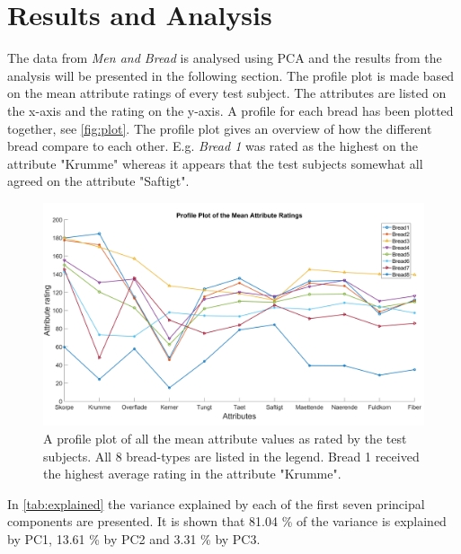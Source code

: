 \section*{Results and Analysis}
\label{Results}
The data from \textit{Men and Bread} is analysed using PCA and the results from the analysis will be presented in the following section.\blankline
%
%
The profile plot is made based on the mean attribute ratings of every test subject. The attributes are listed on the x-axis and the rating on the y-axis. A profile for each bread has been plotted together, see \autoref{fig:plot}. The profile plot gives an overview of how the different bread compare to each other. E.g. \textit{Bread 1} was rated as the highest on the attribute "Krumme" whereas it appears that the test subjects somewhat all agreed on the attribute "Saftigt".
%
\begin{figure}[H]
\centering
\includegraphics[width=\textwidth]{Figure/profile_plot.png}
\caption{A profile plot of all the mean attribute values as rated by the test subjects. All 8 bread-types are listed in the legend. Bread 1 received the highest average rating in the attribute "Krumme".}
\label{fig:plot}
\end{figure}
\noindent
%
%
In \autoref{tab:explained} the variance explained by each of the first seven principal components are presented. It is shown that 81.04 \% of the variance is explained by PC1, 13.61 \% by PC2 and 3.31 \% by PC3. 
%
